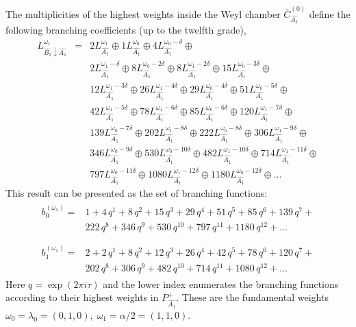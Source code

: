 \documentclass[12pt]{iopart}
\theoremstyle{definition}
\begin{document}
The multiplicities of the highest weights inside the  Weyl chamber
$\bar{C}^{\left( 0 \right)}_{\hat{A_1}}$
define the following branching coefficients (up to the twelfth grade),
\begin{eqnarray*}
  \label{eq:28}
  L^{\omega_1}_{\hat{B_2}\downarrow \hat{A_1}}
  &=&2 L_{\hat{A_1}}^{\omega_1}\oplus 1 L_{\hat{A_1}}^{\omega_0}\oplus 4 L_{\hat{A_1}}^{\omega_0-\delta}\oplus\\
    &&2 L_{\hat{A_1}}^{\omega_1-\delta}\oplus 8 L_{\hat{A_1}}^{\omega_0-2\delta}\oplus
    8 L_{\hat{A_1}}^{\omega_1-2\delta}\oplus 15 L_{\hat{A_1}}^{\omega_0-3\delta}\oplus\\
    &&12 L_{\hat{A_1}}^{\omega_1-3\delta}\oplus 26 L_{\hat{A_1}}^{\omega_1-4\delta}\oplus
    29 L_{\hat{A_1}}^{\omega_0-4\delta}\oplus 51 L_{\hat{A_1}}^{\omega_0-5\delta}\oplus\\
    &&42 L_{\hat{A_1}}^{\omega_1-5\delta}\oplus 78 L_{\hat{A_1}}^{\omega_1-6\delta}\oplus
    85 L_{\hat{A_1}}^{\omega_0-6\delta}\oplus 120 L_{\hat{A_1}}^{\omega_1-7\delta}\oplus\\
    &&139 L_{\hat{A_1}}^{\omega_0-7\delta}\oplus 202 L_{\hat{A_1}}^{\omega_1-8\delta}\oplus
    222 L_{\hat{A_1}}^{\omega_0-8\delta}\oplus 306 L_{\hat{A_1}}^{\omega_1-9\delta}\oplus\\
    &&346 L_{\hat{A_1}}^{\omega_0-9\delta}\oplus 530 L_{\hat{A_1}}^{\omega_0-10\delta}\oplus
    482 L_{\hat{A_1}}^{\omega_1-10\delta}\oplus 714 L_{\hat{A_1}}^{\omega_1-11\delta}\oplus\\
    &&797 L_{\hat{A_1}}^{\omega_0-11\delta}\oplus 1080 L_{\hat{A_1}}^{\omega_1-12\delta}\oplus
    1180 L_{\hat{A_1}}^{\omega_0-12\delta}\oplus \dots
\end{eqnarray*}
This result can be presented as the set of branching functions:
\begin{eqnarray*}
  \label{eq:29}
  \begin{array}{cc}
    b^{(\omega_1)}_{0}= & 1 + 4\,q^{1}+ 8\,q^{2}+ 15\,q^{3}+ 29\,q^{4}+ 51\,q^{5}+ 85\,q^{6}+ 139\,q^{7}+\\
     &222\,q^{8}+ 346\,q^{9}+ 530\,q^{10}+ 797\,q^{11}+ 1180\,q^{12}+\dots\\
  \end{array}\\
  \begin{array}{cc}
    b^{(\omega_1)}_{1}= &2+2\,q^{1}+8\,q^{2}+12\,q^{3}+26\,q^{4}+42\,q^{5}+78\,q^{6}+120\,q^{7}+\\
    & 202\,q^{8}+306\,q^{9}+482\,q^{10}+714\,q^{11}+1080\,q^{12}+\dots
  \end{array}
\end{eqnarray*}
Here $q=\exp (2\pi i \tau)$ and the lower index enumerates the branching functions according
to their highest weights in $P^+_{\hat{A_1}}$.
These are the fundamental weights $\omega_0=\lambda_0=(0,1,0),\; \omega_1=\alpha/2=(1,1,0)$.
\end{document}
